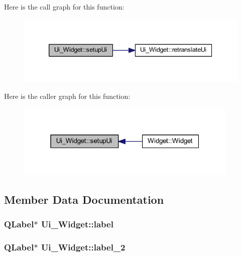 Here is the call graph for this function:\nopagebreak
\begin{figure}[H]
\begin{center}
\leavevmode
\includegraphics[width=339pt]{class_ui___widget_a9039ed8704971418cbe19ef8c9eea266_cgraph}
\end{center}
\end{figure}




Here is the caller graph for this function:\nopagebreak
\begin{figure}[H]
\begin{center}
\leavevmode
\includegraphics[width=301pt]{class_ui___widget_a9039ed8704971418cbe19ef8c9eea266_icgraph}
\end{center}
\end{figure}




\subsection{Member Data Documentation}
\subsubsection[{\texorpdfstring{label}{label}}]{\setlength{\rightskip}{0pt plus 5cm}QLabel$\ast$ Ui\_Widget::label}\hypertarget{class_ui___widget_a3126b93450dcc18cede73b9d1ee7c6b0}{}\label{class_ui___widget_a3126b93450dcc18cede73b9d1ee7c6b0}
\subsubsection[{\texorpdfstring{label\_2}{label_2}}]{\setlength{\rightskip}{0pt plus 5cm}QLabel$\ast$ Ui\_Widget::label\_2}\hypertarget{class_ui___widget_a6f06b143349464b5b19ac0ffe2fc084d}{}\label{class_ui___widget_a6f06b143349464b5b19ac0ffe2fc084d}
